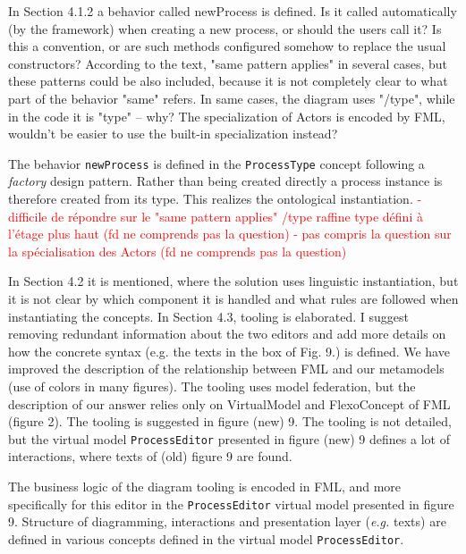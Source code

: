 \documentclass[10pt]{article}
\begin{document}
\begin{response}{In Section 4.1.2 a behavior called newProcess is defined. Is it called automatically (by the framework) when creating a new process, or should the users call it? Is this a convention, or are such methods configured somehow to replace the usual constructors? According to the text, "same pattern applies" in several cases, but these patterns could be also included, because it is not completely clear to what part of the behavior "same" refers. In same cases, the diagram uses "/type", while in the code it is "type" -- why? The specialization of Actors is encoded by FML, wouldn’t be easier to use the built-in specialization instead?}

{\color{teal}The behavior \texttt{newProcess} is defined in the \texttt{ProcessType} concept following a \emph{factory} design pattern. Rather than being created directly a process instance is therefore created from its type. This realizes the ontological instantiation. }
\textcolor{red}{
- difficile de répondre sur le "same pattern applies" /type raffine type défini à l'étage plus haut (fd ne comprends pas la question)
- pas compris la question sur la spécialisation des Actors (fd ne comprends pas la question)
}

\end{response}


\begin{response}{In Section 4.2 it is mentioned, where the solution uses linguistic instantiation, but it is not clear by which component it is handled and what rules are followed when instantiating the concepts. In Section 4.3, tooling is elaborated. I suggest removing redundant information about the two editors and add more details on how the concrete syntax (e.g. the texts in the box of Fig. 9.) is defined.}
We have improved the description of the relationship between FML and our metamodels (use of colors in many figures).
The tooling uses model federation, but the description of our answer relies only on \textsf{VirtualModel} and \textsf{FlexoConcept} of FML (figure 2). The tooling is suggested in figure (new) 9. The tooling is not detailed, but the virtual model \texttt{ProcessEditor} presented in figure (new) 9 defines a lot of interactions, where texts of (old) figure 9 are found.

The business logic of the diagram tooling is encoded in FML, and more specifically for this editor in the \texttt{ProcessEditor} virtual model presented in figure 9. Structure of diagramming, interactions and presentation layer (\emph{e.g.} texts) are defined in various concepts defined in the virtual model \texttt{ProcessEditor}.
\end{response}
\end{document}
